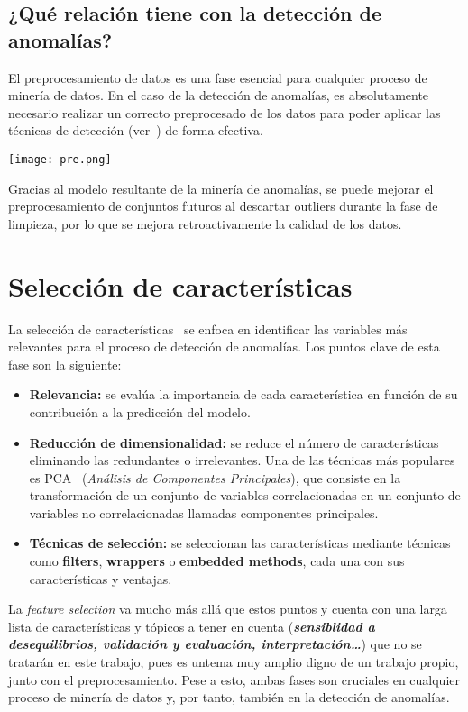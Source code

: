 \subsection{¿Qué relación tiene con la detección de anomalías?}
El preprocesamiento de datos es una fase esencial para cualquier proceso de minería de datos. En
el caso de la detección de anomalías, es absolutamente necesario realizar un correcto preprocesado
de los datos para poder aplicar las técnicas de detección (ver~) de forma
efectiva.~\cite{ramirez2022cleaning}

\noindent
\begin{minipage}{\linewidth}
	\centering
	\texttt{[image: pre.png]}
	\label{fig:fig3}
\end{minipage}

Gracias al modelo resultante de la minería de anomalías, se puede mejorar el preprocesamiento de
conjuntos futuros al descartar outliers durante la fase de limpieza, por lo que se mejora
retroactivamente la calidad de los datos.
\newpage{}
\section{Selección de características}\label{sec:feat}
La selección de características~\cite{guyon2003introduction} se enfoca en identificar las variables más relevantes para el
proceso de detección de anomalías. Los puntos clave de esta fase son la siguiente:

\begin{itemize}
	\item \textbf{Relevancia:} se evalúa la importancia de cada característica en
		función de su contribución a la predicción del modelo.
	\item \textbf{Reducción de dimensionalidad:} se reduce el número de características
		eliminando las redundantes o irrelevantes. Una de las técnicas más populares es
		PCA~\cite{wold1987principal} (\textit{Análisis de Componentes Principales}), que
		consiste en la transformación de un conjunto de variables correlacionadas en un
		conjunto de variables no correlacionadas llamadas componentes principales.
	\item \textbf{Técnicas de selección:} se seleccionan las características mediante
		técnicas como \textbf{filters}, \textbf{wrappers} o \textbf{embedded methods},
		cada una con sus características y ventajas.
\end{itemize}

La \textit{feature selection} va mucho más allá que estos puntos y cuenta con una larga lista de
características y tópicos a tener en cuenta (\textit{\textbf{sensiblidad a desequilibrios, validación
y evaluación, interpretación\ldots}}) que no se tratarán en este trabajo, pues es untema muy
amplio digno de un trabajo propio, junto con el preprocesamiento. Pese a esto, ambas fases son
cruciales en cualquier proceso de minería de datos y, por tanto, también en la detección de anomalías.
